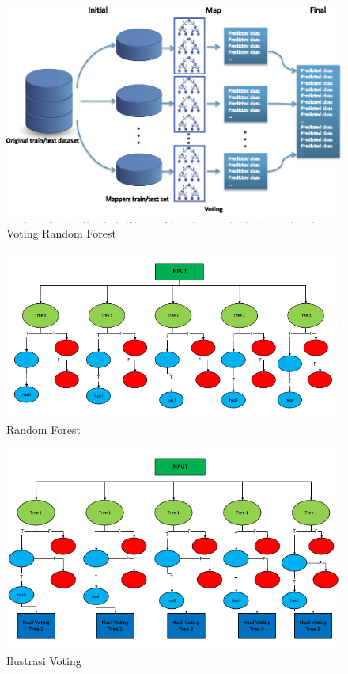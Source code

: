 \begin{figure}[ht]
	\centerline{\includegraphics[width=1\textwidth]{figures/fathi/chapter3/3.png}}
	\caption{Voting Random Forest}
	\label{fig3}
\end{figure}




\begin{figure}[ht]
      \centerline{\includegraphics[width=1\textwidth]
      {figures/cokro/c36}}
      \caption{Random Forest}
      \label{c36}
      \end{figure}

\begin{figure}[ht]
      \centerline{\includegraphics[width=1\textwidth]
      {figures/cokro/c37}}
      \caption{Ilustrasi Voting}
      \label{c37}
      \end{figure}

